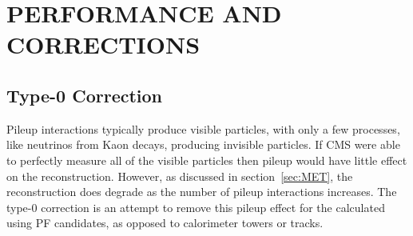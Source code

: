%
%
%
%



\chapter{\uppercase{\VETslash Performance and Corrections}}
\label{appendix:MET}

\section{Type-0 \VETslash Correction}
Pileup interactions typically produce visible particles, with only a few processes, like neutrinos from Kaon decays, producing invisible particles.
If CMS were able to perfectly measure all of the visible particles then pileup would have little effect on the \VETslash reconstruction.
However, as discussed in section~\ref{sec:MET}, the \VETslash reconstruction does degrade as the number of pileup interactions increases.
The type-0 correction is an attempt to remove this pileup effect for the \VETslash calculated using PF candidates, as opposed to calorimeter towers or tracks.

